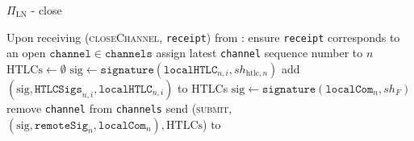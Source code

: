 \begin{protocolbox}{$\Pi_{\mathrm{LN}}$ - close}
  \label{alg:protocol:close}
  \begin{algorithmic}[1]
    \State Upon receiving (\textsc{closeChannel}, \texttt{receipt}) from
    \environment:
    \Indent
      \State ensure \texttt{receipt} corresponds to an open $\mathtt{channel}
      \in \mathtt{channels}$
      \State assign latest \texttt{channel} sequence number to $n$
      \State $\mathrm{HTLCs} \gets \emptyset$
        \State $\mathrm{sig} \gets
        \mathtt{signature}\left(\mathtt{localHTLC}_{n, i}, sh_{\mathrm{htlc},
        n}\right)$
        \State add $\left(\mathrm{sig}, \mathtt{HTLCSigs}_{n, i},
        \mathtt{localHTLC}_{n, i}\right)$ to HTLCs
      \EndFor
      \State $\mathrm{sig} \gets \mathtt{signature}\left(\mathtt{localCom}_n,
      sh_F\right)$
      \State remove \texttt{channel} from \texttt{channels}
      \State send (\textsc{submit}, $\left(\mathrm{sig}, \mathtt{remoteSig}_n,
      \mathtt{localCom}_n\right), \mathrm{HTLCs}$) to \ledger
    \EndIndent
  \end{algorithmic}
\end{protocolbox}
